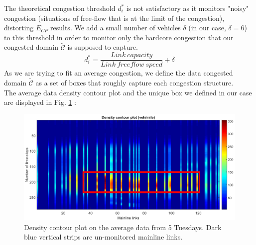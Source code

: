 The theoretical congestion threshold $d_{i}^{*}$ is not satisfactory as it monitors "noisy" congestion (situations of free-flow that is at the limit of the congestion), distorting $E_{CP}$ results. We add a small number of vehicles $\delta$ (in our case, $\delta=6$) to this threshold in order to monitor only the hardcore congestion that our congested domain $\widetilde{\mathscr{C}}$ is supposed to capture.
	\begin{equation*} 
		d_{i}^{*}=\frac{Link\ capacity}{Link\ freeflow\ speed}+\delta
	\end{equation*}
As we are trying to fit an average congestion, we define the data congested domain $\widetilde{\mathscr{C}}$ as a set of boxes that roughly capture each congestion structure.\\
The average data density contour plot and the unique box we defined in our case are displayed in Fig. \ref{fig:pems_contour} :
\begin{figure}[h!]
	\centering
	\caption{Density contour plot on the average data from 5 Tuesdays. Dark blue vertical strips are un-monitored mainline links.}
	\label{fig:pems_contour}
	\includegraphics[width=7in]{figures/PeMS_contour.png}
\end{figure}
\newpage